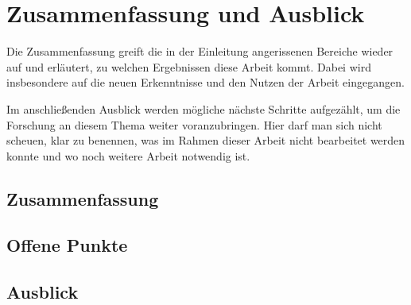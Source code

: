 
\chapter{Zusammenfassung und Ausblick}
\label{chapter-fazit}

Die Zusammenfassung greift die in der Einleitung angerissenen Bereiche wieder auf und erläutert, zu welchen Ergebnissen diese Arbeit kommt. Dabei wird insbesondere auf die neuen Erkenntnisse und den Nutzen der Arbeit eingegangen.

Im anschließenden Ausblick werden mögliche nächste Schritte aufgezählt, um die Forschung an diesem
Thema weiter voranzubringen. Hier darf man sich nicht scheuen, klar zu benennen, was im Rahmen
dieser Arbeit nicht bearbeitet werden konnte und wo noch weitere Arbeit notwendig ist.

\section{Zusammenfassung}
\section{Offene Punkte}
\section{Ausblick}